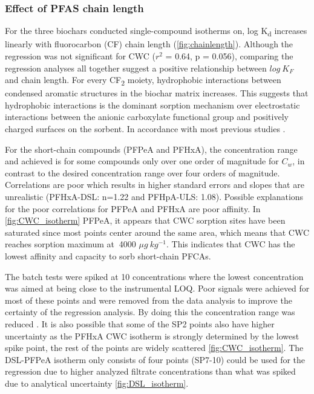 \subsubsection{Effect of PFAS chain length}
For the three biochars conducted single-compound isotherms on, log K\textsubscript{d} increases linearly with fluorocarbon (CF) chain length (\cref{fig:chainlength}). Although the regression was not significant for CWC ($r^2$ = 0.64, p = 0.056), comparing the regression analyses all together suggest a positive relationship between $log~K_F$ and chain length. For every CF\textsubscript{2} moiety, hydrophobic interactions between condensed aromatic structures in the biochar matrix increases. This suggests that hydrophobic interactions is the dominant sorption mechanism over electrostatic interactions between the anionic carboxylate functional group and positively charged surfaces on the sorbent. In accordance with most previous studies \citep{Sorengard2019,higgins2006sorption}. 

For the short-chain compounds (PFPeA and PFHxA), the concentration range and  achieved is for some compounds only over one order of magnitude for $C_w$, in contrast to the desired concentration range over four orders of magnitude. Correlations are poor which results in higher standard errors and slopes that are unrealistic (PFHxA-DSL: n=1.22 and PFHpA-ULS: 1.08). Possible explanations for the poor correlations for PFPeA and PFHxA are poor affinity. In \cref{fig:CWC_isotherm} PFPeA, it appears that CWC sorption sites have been saturated since most points center around the same area, which means that CWC reaches sorption maximum at $~$4000 $\mu g~kg^{-1}$.  This indicates that CWC has the lowest affinity and capacity to sorb short-chain PFCAs. 

The batch tests were spiked at 10 concentrations where the lowest concentration was aimed at being close to the instrumental LOQ. Poor signals were achieved for most of these points and were removed from the data analysis to improve the certainty of the regression analysis. By doing this the concentration range was reduced . It is also possible that some of the SP2 points also have higher uncertainty as the PFHxA CWC isotherm is strongly determined by the lowest spike point, the rest of the points are widely scattered \cref{fig:CWC_isotherm}. The DSL-PFPeA isotherm only consists of four points (SP7-10) could be used for the regression due to higher analyzed filtrate concentrations than what was spiked due to analytical uncertainty \cref{fig:DSL_isotherm}.  

